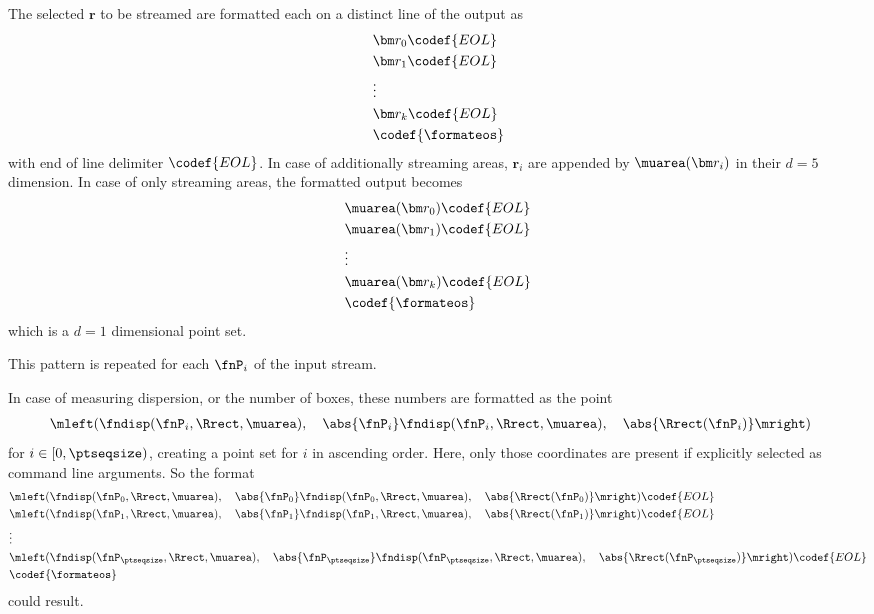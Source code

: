 The selected $\bm r$ to be streamed are formatted each on a distinct line of the output as
\begin{align*}
  &\bm r_0\codef{EOL} \\
  &\bm r_1\codef{EOL} \\
  &\vdots \\
  &\bm r_k\codef{EOL} \\
  &\codef{\formateos}
\end{align*}
with end of line delimiter $\codef{EOL}$. In case of additionally streaming areas, $\bm r_i$ are appended by $\muarea(\bm r_i)$ in their $d=5$ dimension. In case of only streaming areas, the formatted output becomes
\begin{align*}
  &\muarea(\bm r_0)\codef{EOL} \\
  &\muarea(\bm r_1)\codef{EOL} \\
  &\vdots \\
  &\muarea(\bm r_k)\codef{EOL} \\
  &\codef{\formateos}
\end{align*}
which is a $d=1$ dimensional point set.

This pattern is repeated for each $\fnP_i$ of the input stream.

In case of measuring dispersion, or the number of boxes, these numbers are formatted as the point
\begin{align*}
  &\mleft( \fndisp(\fnP_i, \Rrect, \muarea),\quad \abs{\fnP_i} \fndisp(\fnP_i, \Rrect, \muarea),\quad \abs{\Rrect(\fnP_i)} \mright)
\end{align*}
for $i \in [0,\ptseqsize)$, creating a point set for $i$ in ascending order. Here, only those coordinates are present if explicitly selected as command line arguments. So the format
\begin{align*}
  &\mleft( \fndisp(\fnP_0, \Rrect, \muarea),\quad \abs{\fnP_0} \fndisp(\fnP_0, \Rrect, \muarea),\quad \abs{\Rrect(\fnP_0)} \mright)\codef{EOL} \\
  &\mleft( \fndisp(\fnP_1, \Rrect, \muarea),\quad \abs{\fnP_1} \fndisp(\fnP_1, \Rrect, \muarea),\quad \abs{\Rrect(\fnP_1)} \mright)\codef{EOL} \\
  &\vdots \\
  &\mleft( \fndisp(\fnP_\ptseqsize, \Rrect, \muarea),\quad \abs{\fnP_\ptseqsize} \fndisp(\fnP_\ptseqsize, \Rrect, \muarea),\quad \abs{\Rrect(\fnP_\ptseqsize)} \mright)\codef{EOL} \\
  &\codef{\formateos}
\end{align*}
could result.


